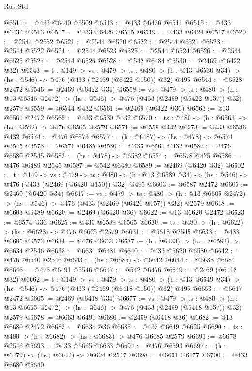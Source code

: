\begin{lexlean}{RustStd}
\begin{coremodule}
@6511 := @433 @6440 @6509
@6513 := @433 @6436 @6511
@6515 := @433 @6432 @6513
@6517 := @433 @6428 @6515
@6519 := @433 @6424 @6517
@6520 := @2544 @2552
@6521 := @2544 @6520
@6522 := @2544 @6521
@6523 := @2544 @6522
@6524 := @2544 @6523
@6525 := @2544 @6524
@6526 := @2544 @6525
@6527 := @2544 @6526
@6528 := @542 @6484
@6530 := @2469 (@6422 @32)
@6543 := {t : @149} ->
  {vs : @479} ->
  {ts : @480} -> (h : @13 @6530 @34) -> (hs : @546) -> @476 (@433 (@2469 (@6422 @150)) @32) @495
@6544 := @6528 @2472
@6546 := @2469 (@6422 @34)
@6558 := {vs : @479} ->
  {ts : @480} -> (h : @13 @6546 @2472) -> (hs : @546) -> @476 (@433 (@2469 (@6422 @157)) @32) @2579
@6559 := @6544 @432
@6561 := @2469 (@6422 @36)
@6563 := @13 @6561 @2472
@6565 := @433 @6530 @432
@6570 := {ts : @480} -> (h : @6563) -> (hs : @592) -> @476 @6565 @2579
@6571 := @6559 @442
@6573 := @433 @6546 @432
@6574 := @476 @6573
@6577 := (h : @6487) -> (hs : @478) -> @6574 @2545
@6578 := @6571 @6485
@6580 := @433 @6561 @432
@6582 := @476 @6580 @2545
@6583 := (hs : @478) -> @6582
@6584 := @6578 @475
@6586 := @476 @6489 @2545
@6587 := @542 @6480
@6589 := @2469 (@6420 @32)
@6602 := {t : @149} ->
  {vs : @479} ->
  {ts : @480} -> (h : @13 @6589 @34) -> (hs : @546) -> @476 (@433 (@2469 (@6420 @150)) @32) @495
@6603 := @6587 @2472
@6605 := @2469 (@6420 @34)
@6617 := {vs : @479} ->
  {ts : @480} -> (h : @13 @6605 @2472) -> (hs : @546) -> @476 (@433 (@2469 (@6420 @157)) @32) @2579
@6618 := @6603 @6489
@6620 := @2469 (@6420 @36)
@6622 := @13 @6620 @2472
@6623 := @6574 @36
@6625 := @433 @6589 @6565
@6630 := {ts : @480} -> (h : @6622) -> (hs : @6623) -> @476 @6625 @2579
@6631 := @6618 @2545
@6633 := @433 @6605 @6573
@6634 := @476 @6633
@6637 := (h : @6483) -> (hs : @6582) -> @6634 @2546
@6638 := @6631 @6481
@6640 := @433 @6620 @6580
@6642 := @476 @6640 @2546
@6643 := (hs : @6586) -> @6642
@6644 := @6638 @6584
@6646 := @476 @6491 @2546
@6647 := @542 @6476
@6649 := @2469 (@6418 @32)
@6662 := {t : @149} ->
  {vs : @479} ->
  {ts : @480} -> (h : @13 @6649 @34) -> (hs : @546) -> @476 (@433 (@2469 (@6418 @150)) @32) @495
@6663 := @6647 @2472
@6665 := @2469 (@6418 @34)
@6677 := {vs : @479} ->
  {ts : @480} -> (h : @13 @6665 @2472) -> (hs : @546) -> @476 (@433 (@2469 (@6418 @157)) @32) @2579
@6678 := @6663 @6491
@6680 := @2469 (@6418 @36)
@6682 := @13 @6680 @2472
@6683 := @6634 @36
@6685 := @433 @6649 @6625
@6690 := {ts : @480} -> (h : @6682) -> (hs : @6683) -> @476 @6685 @2579
@6691 := @6678 @2546
@6693 := @433 @6665 @6633
@6694 := @476 @6693
@6697 := (h : @6479) -> (hs : @6642) -> @6694 @2547
@6698 := @6691 @6477
@6700 := @433 @6680 @6640

\end{coremodule}
\end{lexlean}
